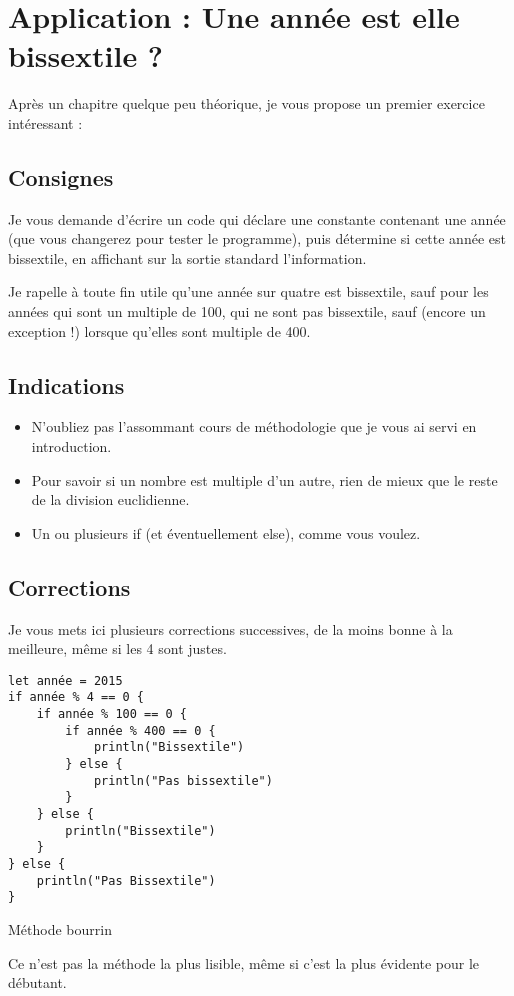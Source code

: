 \section{Application : Une année est elle bissextile ?}
Après un chapitre quelque peu théorique, je vous propose un premier exercice intéressant :
\subsection{Consignes}
Je vous demande d'écrire un code qui déclare une constante contenant une année
(que vous changerez pour tester le programme),
puis détermine si cette année est bissextile,
en affichant sur la sortie standard l'information.

Je rapelle à toute fin utile qu'une année sur quatre est bissextile, sauf pour les années qui sont un multiple de 100, qui ne sont pas bissextile, sauf (encore un exception !) lorsque qu'elles sont multiple de 400.
\subsection{Indications}
\begin{itemize}

\item N'oubliez pas l'assommant cours de méthodologie que je vous ai servi en introduction.

\item Pour savoir si un nombre est multiple d'un autre,
rien de mieux que le reste de la division euclidienne.

\item Un ou plusieurs if (et éventuellement else), comme vous voulez.
\end{itemize}
\pagebreak %
\subsection{Corrections}
Je vous mets ici plusieurs corrections successives,
de la moins bonne à la meilleure, même si les 4 sont justes.

\begin{listing}[h!]
\begin{verbatim}
let année = 2015
if année % 4 == 0 {
    if année % 100 == 0 {
        if année % 400 == 0 {
            println("Bissextile")
        } else {
            println("Pas bissextile")
        }
    } else {
        println("Bissextile")
    }
} else {
    println("Pas Bissextile")
}
\end{verbatim}
\caption{Méthode bourrin}
\end{listing}
Ce n'est pas la méthode la plus lisible,
même si c'est la plus évidente pour le débutant.

